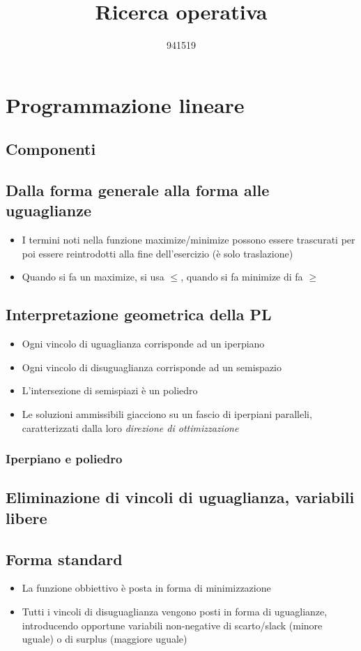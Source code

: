 \documentclass[11pt, oneside]{article}   	%
\title{Ricerca operativa}
\author{941519}
\begin{document}
\maketitle
\section{Programmazione lineare}
\subsection{Componenti}
\subsection{Dalla forma generale alla forma alle uguaglianze}
\begin{itemize}
\item I termini noti nella funzione maximize/minimize possono essere trascurati per poi essere reintrodotti alla fine dell'esercizio (è solo traslazione)
\item Quando si fa un maximize, si usa $\leq$, quando si fa minimize di fa $\geq$
\end{itemize}
\subsection{Interpretazione geometrica della PL}
\begin{itemize}
\item Ogni vincolo di uguaglianza corrisponde ad un iperpiano
\item Ogni vincolo di disuguaglianza corrisponde ad un semispazio
\item L'intersezione di semispiazi è un poliedro
\item Le soluzioni ammissibili giacciono su un fascio di iperpiani paralleli, caratterizzati dalla loro \emph{direzione di ottimizzazione}
\end{itemize}
\subsubsection{Iperpiano e poliedro}
\subsection{Eliminazione di vincoli di uguaglianza, variabili libere}
\subsection{Forma standard}
\begin{itemize}
\item La funzione obbiettivo è posta in forma di minimizzazione
\item Tutti i vincoli di disuguaglianza vengono posti in forma di uguaglianze, introducendo opportune variabili non-negative di scarto/slack (minore uguale) o di surplus (maggiore uguale)
\end{itemize}
\end{document}
